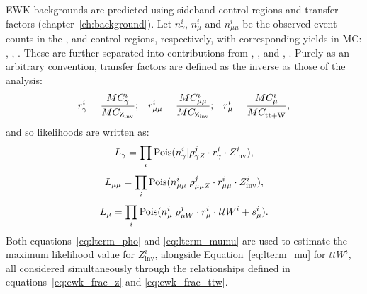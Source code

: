 EWK backgrounds are predicted using sideband control regions and transfer 
factors (chapter~\ref{ch:background}). Let $n_{\gamma}^i$, $n_{\mu}^i$ and
$n_{\mu\mu}^i$ be
the observed event counts in the \gj, \mj and \mmj control regions, 
respectively, with corresponding yields in MC: \mcp, \mcm, \mcmm. These are
further separated into contributions from \zinv, \mczinv, and ,
\mcttw. Purely as an arbitrary convention, transfer factors are defined as
the inverse as those of the analysis:
% 
\begin{equation}
r_{\gamma}^i = \frac{MC_{\gamma}^i}{MC_{\text{Z}_{\text{inv}}}};\;\;\;
r_{\mu\mu}^i = \frac{MC_{\mu\mu}^i}{MC_{\text{Z}_{\text{inv}}}};\;\;\;
r_{\mu}^i = \frac{MC_{\mu}^i}{MC_{\rm{t}\bar{\rm{t}}+\text{W}}},
\end{equation}
% 
and so likelihoods are written as:
% 
\begin{equation}
L_{\gamma} = \prod_i \text{Pois}(n_{\gamma}^i | \rho^j_{\gamma Z} \cdot r^i_{\gamma} \cdot Z^i_{\text{inv}}),
\label{eq:lterm_pho}
\end{equation}
\begin{equation}
L_{\mu\mu} = \prod_i \text{Pois}(n_{\mu\mu}^i | \rho^j_{\mu\mu Z} \cdot r^i_{\mu\mu} \cdot Z^i_{\text{inv}}),
\label{eq:lterm_mumu}
\end{equation}
\begin{equation}
L_{\mu} = \prod_i \text{Pois}(n_{\mu}^i | \rho^j_{\mu W} \cdot r^i_{\mu} \cdot ttW^i + s_{\mu}^i).
\label{eq:lterm_mu}
\end{equation}
% 
Both equations~\ref{eq:lterm_pho} and \ref{eq:lterm_mumu} are used to estimate the 
maximum likelihood value for $Z^i_{\text{inv}}$, alongside Equation~\ref{eq:lterm_mu} 
for $ttW^i$, all considered simultaneously through the relationships defined in
equations~\ref{eq:ewk_frac_z} and \ref{eq:ewk_frac_ttw}.

